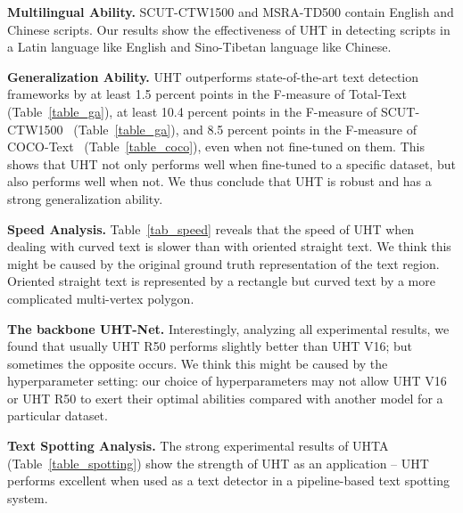 \documentclass[10pt,twocolumn,letterpaper]{article}
\begin{document}
\textbf{Multilingual Ability.}  SCUT-CTW1500 and MSRA-T\-D500 contain English and Chinese scripts. Our
results show the effectiveness of UHT in detecting scripts in a Latin language like English and Sino-Tibetan language like Chinese.

\textbf{Generalization Ability.} UHT outperforms state-of-the-art text detection frameworks by at least 1.5 percent points in the F-measure of Total-Text~\cite{total-text} (Table~\ref{table_ga}), at least 10.4 percent points in the F-measure of SCUT-CTW1500~\cite{scut-ctw1500} (Table~\ref{table_ga}), and 8.5 percent points in the F-measure of COCO-Text~\cite{cocotext} (Table~\ref{table_coco}), even when not fine-tuned on them.  This shows that UHT not only performs well when fine-tuned to a specific dataset, but also performs well when not.  We thus conclude that UHT is robust and has a strong generalization ability.


\textbf{Speed Analysis.} Table~\ref{tab_speed} reveals that the speed of UHT when dealing with curved text is slower than with oriented straight text. We think this might be caused by the original ground truth representation of the text region. Oriented straight text is represented by a rectangle but curved text by a more complicated multi-vertex polygon. 

\begin{table}[t]
\centering
{}
\vspace{0.1cm}
\caption{Speed of UHT. The unit of measure is FPS.}
\label{tab_speed}
\end{table}




\textbf{The backbone UHT-Net.} Interestingly, analyzing all experimental results, we found that usually UHT R50 performs slightly better than UHT V16; but sometimes the opposite occurs. 
We think this might be caused by the hyperparameter setting: our choice of hyperparameters may not allow UHT V16 or UHT R50 to exert their optimal abilities compared with another model for a particular dataset.

\textbf{Text Spotting Analysis.} The strong experimental results of UHTA (Table~\ref{table_spotting}) show the strength of UHT as an application -- UHT performs excellent when used as a text detector in a pipeline-based text spotting system.
\end{document}
